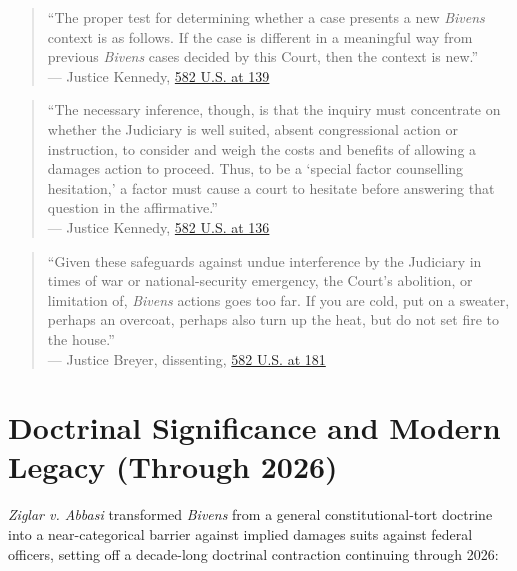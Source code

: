 \documentclass[12pt]{article}
\begin{document}
\begin{quote}
``The proper test for determining whether a case presents a new \textit{Bivens} context is as follows. If the case is different in a meaningful way from previous \textit{Bivens} cases decided by this Court, then the context is new.''\\
--- Justice Kennedy, \href{https://www.law.cornell.edu/supremecourt/text/15-1358}{582 U.S. at 139}
\end{quote}

\begin{quote}
``The necessary inference, though, is that the inquiry must concentrate on whether the Judiciary is well suited, absent congressional action or instruction, to consider and weigh the costs and benefits of allowing a damages action to proceed. Thus, to be a `special factor counselling hesitation,' a factor must cause a court to hesitate before answering that question in the affirmative.''\\
--- Justice Kennedy, \href{https://www.law.cornell.edu/supremecourt/text/15-1358}{582 U.S. at 136}
\end{quote}

\begin{quote}
``Given these safeguards against undue interference by the Judiciary in times of war or national-security emergency, the Court's abolition, or limitation of, \textit{Bivens} actions goes too far. If you are cold, put on a sweater, perhaps an overcoat, perhaps also turn up the heat, but do not set fire to the house.''\\
--- Justice Breyer, dissenting, \href{https://www.law.cornell.edu/supremecourt/text/15-1358}{582 U.S. at 181}
\end{quote}

\section{Doctrinal Significance and Modern Legacy (Through 2026)}

\textit{Ziglar v. Abbasi} transformed \textit{Bivens} from a general constitutional-tort doctrine into a near-categorical barrier against implied damages suits against federal officers, setting off a decade-long doctrinal contraction continuing through 2026:
\end{document}
